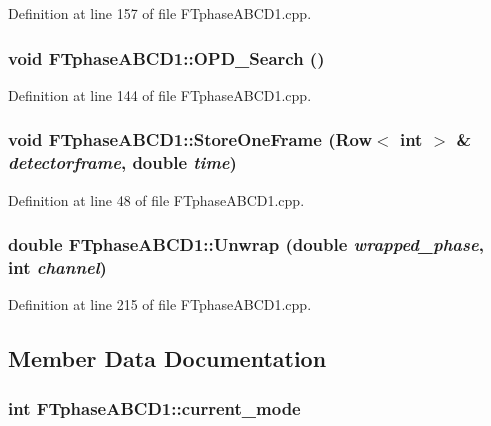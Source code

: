 Definition at line 157 of file FTphaseABCD1.cpp.

\hypertarget{classFTphaseABCD1_aceb9b2e0b45091dadea8c89f67478395}{
\subsubsection[{OPD\_\-Search}]{\setlength{\rightskip}{0pt plus 5cm}void FTphaseABCD1::OPD\_\-Search ()}}
\label{classFTphaseABCD1_aceb9b2e0b45091dadea8c89f67478395}


Definition at line 144 of file FTphaseABCD1.cpp.

\hypertarget{classFTphaseABCD1_afa8d4ec989b35930c536fd3895eae136}{
\subsubsection[{StoreOneFrame}]{\setlength{\rightskip}{0pt plus 5cm}void FTphaseABCD1::StoreOneFrame ({\bf Row}$<$ int $>$ \& {\em detectorframe}, \/  double {\em time})}}
\label{classFTphaseABCD1_afa8d4ec989b35930c536fd3895eae136}


Definition at line 48 of file FTphaseABCD1.cpp.

\hypertarget{classFTphaseABCD1_add33ab3594f5a3059e47dd43ffd9457d}{
\subsubsection[{Unwrap}]{\setlength{\rightskip}{0pt plus 5cm}double FTphaseABCD1::Unwrap (double {\em wrapped\_\-phase}, \/  int {\em channel})}}
\label{classFTphaseABCD1_add33ab3594f5a3059e47dd43ffd9457d}


Definition at line 215 of file FTphaseABCD1.cpp.



\subsection{Member Data Documentation}
\hypertarget{classFTphaseABCD1_a7966cf4ce72c3301cf303c39a6133d6d}{
\subsubsection[{current\_\-mode}]{\setlength{\rightskip}{0pt plus 5cm}int {\bf FTphaseABCD1::current\_\-mode}}}
\label{classFTphaseABCD1_a7966cf4ce72c3301cf303c39a6133d6d}



